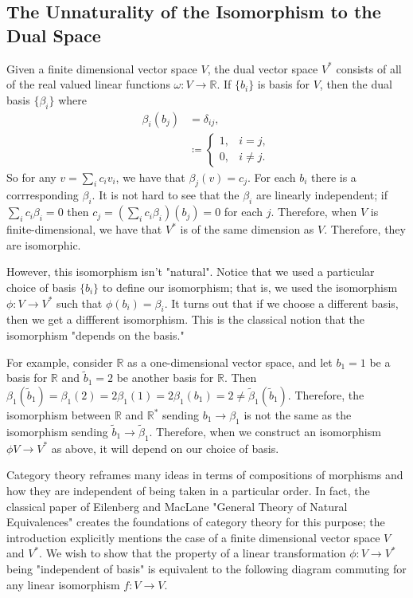 \subsection{The Unnaturality of the Isomorphism to the Dual Space}

Given a finite dimensional vector space \(V\), the dual vector space \(V^*\) consists of all of the real valued linear functions \(\omega : V \to \mathbb R\). If \(\{b_i\}\) is basis
for \(V\), then the dual basis \(\{\beta_i\}\) where 
\begin{align}
\beta_i(b_j) & =  \delta_{ij}, \\
    & \coloneqq \begin{cases} 1, & i = j, \\ 0, & i \neq j. \end{cases}
\end{align}
So for any \(v = \sum_i c_i v_i\), we have that \(\beta_j(v) = c_j\). For each \(b_i\) there is a corrresponding \(\beta_i\). It is not hard to see that the \(\beta_i\) are linearly
independent; if \(\sum_i c_i \beta_i = 0\) then \(c_j = (\sum_i c_i \beta_i)(b_j) = 0\) for each \(j\). Therefore, when \(V\) is finite-dimensional, we have that
\(V^*\) is of the same dimension as \(V\). Therefore, they are isomorphic.

However, this isomorphism isn't "natural". Notice that we used a particular choice of basis \(\{b_i\}\) to define our isomorphism; that is, we used the isomorphism \(\phi : V \to V^*\) 
such that \(\phi(b_i) = \beta_i\). It turns out that if we choose a different basis, then we get a diffferent isomorphism. This is the classical notion that the isomorphism "depends
on the basis."

For example, consider \(\mathbb R\) as a one-dimensional vector space, and let \(b_1 = 1\) be a basis for \(\mathbb R\) and \(\tilde b_1 = 2\) be another basis for \(\mathbb R\).
Then \(\beta_1(\tilde b_1) = \beta_1(2) = 2\beta_1(1) = 2\beta_1(b_1) = 2 \neq \tilde\beta_1(\tilde b_1)\). Therefore, the isomorphism between \(\mathbb R\) and \(\mathbb R^*\)
sending \(b_1 \to \beta_1\) is not the same as the isomorphism sending \(\tilde b_1 \to \tilde \beta_1\). Therefore, when we construct an isomorphism \(\phi V \to V^*\) as above, it
will depend on our choice of basis.

Category theory reframes many ideas in terms of compositions of morphisms and how they are independent of being taken in a particular order. In fact, the classical paper of Eilenberg
and MacLane "General Theory of Natural Equivalences" creates the foundations of category theory for this purpose; the introduction explicitly mentions the case of a finite dimensional
vector space \(V\) and \(V^*\). We wish to show that the property of a linear transformation \(\phi : V \to V^*\) being "independent of basis" is equivalent to the following
diagram commuting for any linear isomorphism \(f: V \to V\).

